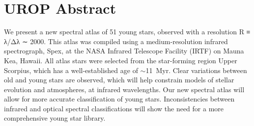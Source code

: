 \section{UROP Abstract}

We present a new spectral atlas of 51 young stars, observed with a resolution R ≡ λ/Δλ ∼ 2000.  This atlas was compiled using a medium-resolution infrared spectrograph, Spex, at the NASA Infrared Telescope Facility (IRTF) on Mauna Kea, Hawaii.  
All atlas stars were selected from the star-forming region Upper Scorpius, which has a well-established age of $\sim$11~Myr. Clear variations between old and young stars are observed, which will help constrain models of stellar evolution and atmospheres, at infrared wavelengths. Our new spectral atlas will allow for more accurate classification of young stars.  Inconsistencies between infrared and optical spectral classifications will show the need for a more comprehensive young star library.